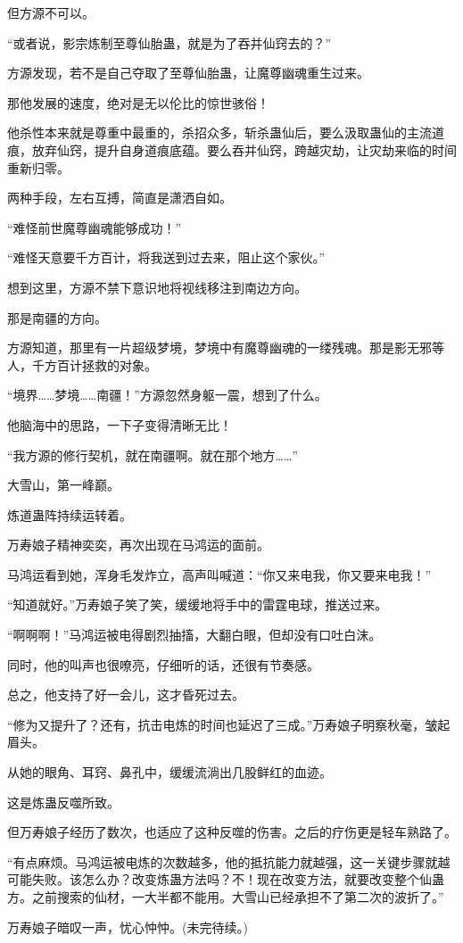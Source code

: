 \begin{this_body}
但方源不可以。

“或者说，影宗炼制至尊仙胎蛊，就是为了吞并仙窍去的？”

方源发现，若不是自己夺取了至尊仙胎蛊，让魔尊幽魂重生过来。

那他发展的速度，绝对是无以伦比的惊世骇俗！

他杀性本来就是尊重中最重的，杀招众多，斩杀蛊仙后，要么汲取蛊仙的主流道痕，放弃仙窍，提升自身道痕底蕴。要么吞并仙窍，跨越灾劫，让灾劫来临的时间重新归零。

两种手段，左右互搏，简直是潇洒自如。

“难怪前世魔尊幽魂能够成功！”

“难怪天意要千方百计，将我送到过去来，阻止这个家伙。”

想到这里，方源不禁下意识地将视线移注到南边方向。

那是南疆的方向。

方源知道，那里有一片超级梦境，梦境中有魔尊幽魂的一缕残魂。那是影无邪等人，千方百计拯救的对象。

“境界……梦境……南疆！”方源忽然身躯一震，想到了什么。

他脑海中的思路，一下子变得清晰无比！

“我方源的修行契机，就在南疆啊。就在那个地方……”

大雪山，第一峰巅。

炼道蛊阵持续运转着。

万寿娘子精神奕奕，再次出现在马鸿运的面前。

马鸿运看到她，浑身毛发炸立，高声叫喊道：“你又来电我，你又要来电我！”

“知道就好。”万寿娘子笑了笑，缓缓地将手中的雷霆电球，推送过来。

“啊啊啊！”马鸿运被电得剧烈抽搐，大翻白眼，但却没有口吐白沫。

同时，他的叫声也很嘹亮，仔细听的话，还很有节奏感。

总之，他支持了好一会儿，这才昏死过去。

“修为又提升了？还有，抗击电炼的时间也延迟了三成。”万寿娘子明察秋毫，皱起眉头。

从她的眼角、耳窍、鼻孔中，缓缓流淌出几股鲜红的血迹。

这是炼蛊反噬所致。

但万寿娘子经历了数次，也适应了这种反噬的伤害。之后的疗伤更是轻车熟路了。

“有点麻烦。马鸿运被电炼的次数越多，他的抵抗能力就越强，这一关键步骤就越可能失败。该怎么办？改变炼蛊方法吗？不！现在改变方法，就要改变整个仙蛊方。之前搜索的仙材，一大半都不能用。大雪山已经承担不了第二次的波折了。”

万寿娘子暗叹一声，忧心忡忡。(未完待续。)

\end{this_body}


